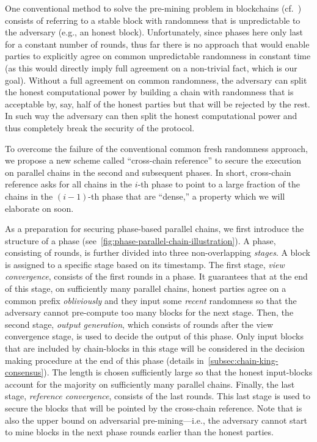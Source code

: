 One conventional method to solve the pre-mining problem in blockchains (cf.~\cite{PODC:PasShi17}) consists of referring to a stable block with randomness that is unpredictable to the adversary (e.g., an honest block).
%
Unfortunately, since phases here only last for a constant number of rounds, thus far there is no approach that would enable parties to explicitly agree on common unpredictable randomness in constant time (as this would directly imply full agreement on a non-trivial fact, which is our goal).
%
Without a full agreement on common randomness, the adversary can split the honest computational power by building a chain with randomness that is acceptable by, say, half of the honest parties but that will be rejected by the rest.
%
In such way the adversary can then split the honest computational power and thus completely break the security of the protocol.

To overcome the failure of the conventional common fresh randomness approach, we propose a new scheme called ``cross-chain reference'' to secure the execution on parallel chains in the second and subsequent phases.
%
In short, cross-chain reference asks for all chains in the $i$-th phase to point to a large fraction of the chains in the $(i - 1)$-th phase that are ``dense,'' a property which we will elaborate on soon.

As a preparation for securing phase-based parallel chains, we first introduce the structure of a phase (see~\cref{fig:phase-parallel-chain-illustration}).
%
A phase, consisting of \phaseLength rounds, is further divided into three non-overlapping \emph{stages}.
%
A block is assigned to a specific stage based on its timestamp.
%
The first stage, \emph{view convergence}, consists of the first \phaseViewLength rounds in a phase.
%
It guarantees that at the end of this stage, on sufficiently many parallel chains, honest parties agree on a common prefix \emph{obliviously} and they input some \emph{recent} randomness so that the adversary cannot pre-compute too many blocks for the next stage.
%
Then, the second stage, \emph{output generation}, which consists of \phaseOutputLength rounds after the view convergence stage, is used to decide the output of this phase.
%
Only input blocks that are included by chain-blocks in this stage will be considered in the decision making procedure at the end of this phase (details in~\cref{subsec:chain-king-consensus}).
%
The length \phaseOutputLength is chosen sufficiently large  so that the honest input-blocks account for the majority on sufficiently many parallel chains.
%
Finally, the last stage, \emph{reference convergence}, consists of the last \phaseRefLength rounds.
%
This last stage is used to secure the blocks that will be pointed by the cross-chain reference.
%
Note that \phaseRefLength is also the upper bound on adversarial pre-mining---i.e., the adversary cannot start to mine blocks in the next phase \phaseRefLength rounds earlier than the honest parties.

